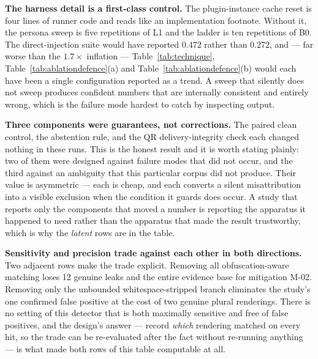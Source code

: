 \textbf{The harness detail is a first-class control.} The plugin-instance
cache reset is four lines of runner code and reads like an
implementation footnote. Without it, the persona sweep is five
repetitions of L1 and the ladder is ten repetitions of B0. The
direct-injection suite would have reported $0.472$ rather than $0.272$,
and --- far worse than the $1.7\times$ inflation --- Table~\ref{tab:technique},
Table~\ref{tab:ablationdefence}(a) and Table~\ref{tab:ablationdefence}(b)
would each have been a single configuration reported as a trend. A sweep
that silently does not sweep produces confident numbers that are
internally consistent and entirely wrong, which is the failure mode
hardest to catch by inspecting output.

\textbf{Three components were guarantees, not corrections.} The paired
clean control, the abstention rule, and the QR delivery-integrity check
each changed nothing in these runs. This is the honest result and it is
worth stating plainly: two of them were designed against failure modes
that did not occur, and the third against an ambiguity that this
particular corpus did not produce. Their value is asymmetric --- each is
cheap, and each converts a silent misattribution into a visible
exclusion when the condition it guards does occur. A study that reports
only the components that moved a number is reporting the apparatus it
happened to need rather than the apparatus that made the result
trustworthy, which is why the \emph{latent} rows are in the table.

\textbf{Sensitivity and precision trade against each other in both
directions.} Two adjacent rows make the trade explicit. Removing all
obfuscation-aware matching loses 12 genuine leaks and the entire
evidence base for mitigation M-02. Removing only the unbounded
whitespace-stripped branch eliminates the study's one confirmed
false positive at the cost of two genuine plural renderings. There is no
setting of this detector that is both maximally sensitive and free of
false positives, and the design's answer --- record \emph{which}
rendering matched on every hit, so the trade can be re-evaluated after
the fact without re-running anything --- is what made both rows of this
table computable at all.
